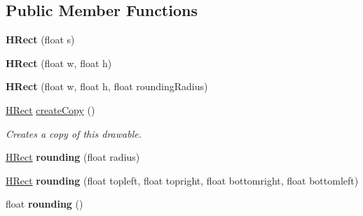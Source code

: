 \subsection*{Public Member Functions}
\begin{DoxyCompactItemize}
\item 
\hypertarget{classhype_1_1extended_1_1drawable_1_1_h_rect_a78bf1b1c0ed63f83811a28805886b18c}{{\bfseries H\-Rect} (float s)}\label{classhype_1_1extended_1_1drawable_1_1_h_rect_a78bf1b1c0ed63f83811a28805886b18c}

\item 
\hypertarget{classhype_1_1extended_1_1drawable_1_1_h_rect_a5566eae4264f205265c59a6c8e79f867}{{\bfseries H\-Rect} (float w, float h)}\label{classhype_1_1extended_1_1drawable_1_1_h_rect_a5566eae4264f205265c59a6c8e79f867}

\item 
\hypertarget{classhype_1_1extended_1_1drawable_1_1_h_rect_abe11f4aa672cb26f906999310a7447ef}{{\bfseries H\-Rect} (float w, float h, float rounding\-Radius)}\label{classhype_1_1extended_1_1drawable_1_1_h_rect_abe11f4aa672cb26f906999310a7447ef}

\item 
\hyperlink{classhype_1_1extended_1_1drawable_1_1_h_rect}{H\-Rect} \hyperlink{classhype_1_1extended_1_1drawable_1_1_h_rect_acf678ec20a13f2bbf2befd1110234e2c}{create\-Copy} ()
\begin{DoxyCompactList}\small\item\em Creates a copy of this drawable. \end{DoxyCompactList}\item 
\hypertarget{classhype_1_1extended_1_1drawable_1_1_h_rect_aee2ab04d2ff50abe87c0622aa870bd88}{\hyperlink{classhype_1_1extended_1_1drawable_1_1_h_rect}{H\-Rect} {\bfseries rounding} (float radius)}\label{classhype_1_1extended_1_1drawable_1_1_h_rect_aee2ab04d2ff50abe87c0622aa870bd88}

\item 
\hypertarget{classhype_1_1extended_1_1drawable_1_1_h_rect_ade308b69a8b6ac1c03d8e0e5f2dcc0ee}{\hyperlink{classhype_1_1extended_1_1drawable_1_1_h_rect}{H\-Rect} {\bfseries rounding} (float topleft, float topright, float bottomright, float bottomleft)}\label{classhype_1_1extended_1_1drawable_1_1_h_rect_ade308b69a8b6ac1c03d8e0e5f2dcc0ee}

\item 
\hypertarget{classhype_1_1extended_1_1drawable_1_1_h_rect_a0a111fc3f6117886c14f9c4e24269b2d}{float {\bfseries rounding} ()}\label{classhype_1_1extended_1_1drawable_1_1_h_rect_a0a111fc3f6117886c14f9c4e24269b2d}


\end{DoxyCompactItemize}

